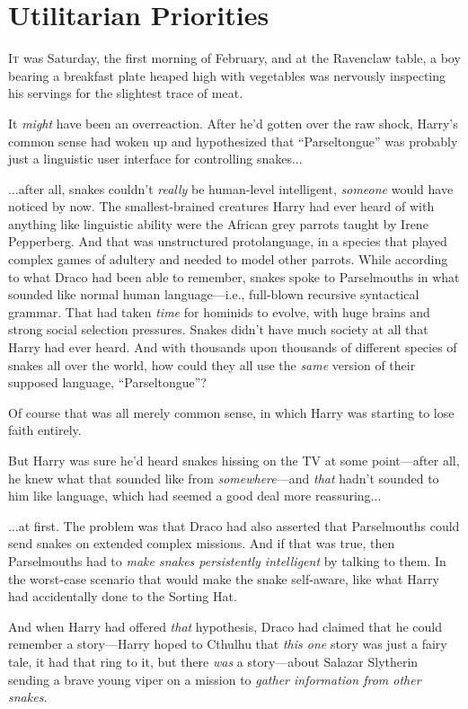 \chapter{Utilitarian Priorities}

\lettrine{I}{t} was Saturday, the first morning of February, and at the Ravenclaw table, a boy bearing a breakfast plate heaped high with vegetables was nervously inspecting his servings for the slightest trace of meat.

It \emph{might} have been an overreaction. After he’d gotten over the raw shock, Harry’s common sense had woken up and hypothesized that “Parseltongue” was probably just a linguistic user interface for controlling snakes...

...after all, snakes couldn’t \emph{really} be human-level intelligent, \emph{someone} would have noticed by now. The smallest-brained creatures Harry had ever heard of with anything like linguistic ability were the African grey parrots taught by Irene Pepperberg. And that was unstructured protolanguage, in a species that played complex games of adultery and needed to model other parrots. While according to what Draco had been able to remember, snakes spoke to Parselmouths in what sounded like normal human language—i.e., full-blown recursive syntactical grammar. That had taken \emph{time} for hominids to evolve, with huge brains and strong social selection pressures. Snakes didn’t have much society at all that Harry had ever heard. And with thousands upon thousands of different species of snakes all over the world, how could they all use the \emph{same} version of their supposed language, “Parseltongue”?

Of course that was all merely common sense, in which Harry was starting to lose faith entirely.

But Harry was sure he’d heard snakes hissing on the TV at some point—after all, he knew what that sounded like from \emph{somewhere}—and \emph{that} hadn’t sounded to him like language, which had seemed a good deal more reassuring...

...at first. The problem was that Draco had also asserted that Parselmouths could send snakes on extended complex missions. And if that was true, then Parselmouths had to \emph{make snakes persistently intelligent} by talking to them. In the worst-case scenario that would make the snake self-aware, like what Harry had accidentally done to the Sorting Hat.

And when Harry had offered \emph{that} hypothesis, Draco had claimed that he could remember a story—Harry hoped to Cthulhu that \emph{this one} story was just a fairy tale, it had that ring to it, but there \emph{was} a story—about Salazar Slytherin sending a brave young viper on a mission to \emph{gather information from other snakes.}


